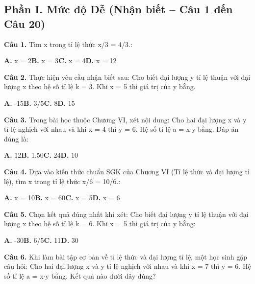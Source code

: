 \documentclass[11pt,a4paper]{article}
\begin{document}
\subsection*{\color{accent} Phần I. Mức độ Dễ (Nhận biết -- Câu 1 đến Câu 20)}
\textbf{\color{primary} Câu 1.} Tìm x trong tỉ lệ thức x/3 = 4/3.:\par
\hspace*{1.5em}\textbf{A.} x = 2\quad\quad \textbf{B.} x = 3\quad\quad \textbf{C.} x = 4\quad\quad \textbf{D.} x = 12\par\vspace{2pt}
\textbf{\color{primary} Câu 2.} Thực hiện yêu cầu nhận biết sau: Cho biết đại lượng y tỉ lệ thuận với đại lượng x theo hệ số tỉ lệ k = 3. Khi x = 5 thì giá trị của y bằng.\par
\hspace*{1.5em}\textbf{A.} -15\quad\quad \textbf{B.} 3/5\quad\quad \textbf{C.} 8\quad\quad \textbf{D.} 15\par\vspace{2pt}
\textbf{\color{primary} Câu 3.} Trong bài học thuộc Chương VI, xét nội dung: Cho hai đại lượng x và y tỉ lệ nghịch với nhau và khi x = 4 thì y = 6. Hệ số tỉ lệ a = x$\cdot$y bằng. Đáp án đúng là:\par
\hspace*{1.5em}\textbf{A.} 12\quad\quad \textbf{B.} 1.50\quad\quad \textbf{C.} 24\quad\quad \textbf{D.} 10\par\vspace{2pt}
\textbf{\color{primary} Câu 4.} Dựa vào kiến thức chuẩn SGK của Chương VI (Tỉ lệ thức và đại lượng tỉ lệ), tìm x trong tỉ lệ thức x/6 = 10/6.:\par
\hspace*{1.5em}\textbf{A.} x = 10\quad\quad \textbf{B.} x = 60\quad\quad \textbf{C.} x = 5\quad\quad \textbf{D.} x = 6\par\vspace{2pt}
\textbf{\color{primary} Câu 5.} Chọn kết quả đúng nhất khi xét: Cho biết đại lượng y tỉ lệ thuận với đại lượng x theo hệ số tỉ lệ k = 6. Khi x = 5 thì giá trị của y bằng:\par
\hspace*{1.5em}\textbf{A.} -30\quad\quad \textbf{B.} 6/5\quad\quad \textbf{C.} 11\quad\quad \textbf{D.} 30\par\vspace{2pt}
\textbf{\color{primary} Câu 6.} Khi làm bài tập cơ bản về tỉ lệ thức và đại lượng tỉ lệ, một học sinh gặp câu hỏi: Cho hai đại lượng x và y tỉ lệ nghịch với nhau và khi x = 7 thì y = 6. Hệ số tỉ lệ a = x$\cdot$y bằng. Kết quả nào dưới đây đúng?\par
\end{document}
